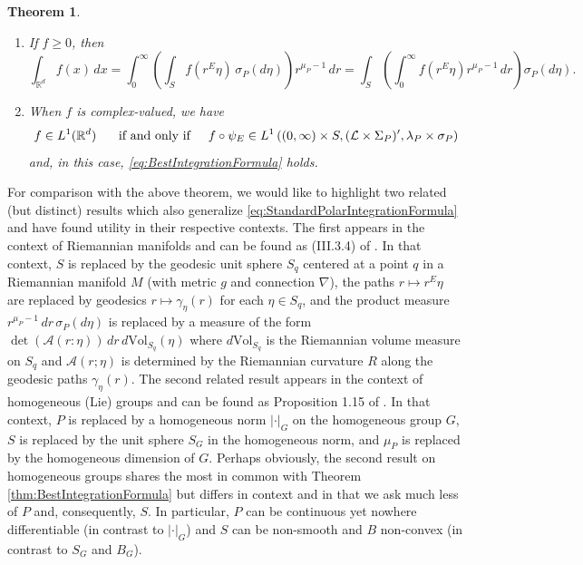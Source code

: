 \documentclass[11pt]{article}
\newtheorem{theorem}{Theorem}[section]
\theoremstyle{remark}
\renewcommand\det{\operatorname{det}}
\begin{document}
\begin{theorem}
\begin{enumerate}
\begin{enumerate}
\item If $f\geq 0$, then
\begin{equation}\label{eq:BestIntegrationFormula}
\int_{\mathbb{R}^d}f(x)\,dx=\int_0^\infty\left(\int_S f(r^E\eta)\,\sigma_P(d\eta)\right)r^{\mu_P-1}\,dr=\int_S\left(\int_0^\infty f(r^E\eta)r^{\mu_P-1}\,dr\right)\sigma_P(d\eta).
\end{equation}
\item When $f$ is complex-valued, we have 
\begin{equation*}f\in L^1(\mathbb{R}^d)\hspace{.5cm}\mbox{ if and only if}\hspace{.5cm}f\circ\psi_E\in L^1\left((0,\infty)\times S,(\mathcal{L}\times\Sigma_P)',\lambda_P\times\sigma_P\right)
\end{equation*} 
and, in this case, \eqref{eq:BestIntegrationFormula} holds.
\end{enumerate}
\end{enumerate}
\end{theorem}

\noindent For comparison with the above theorem, we would like to highlight two related (but distinct) results which also generalize \eqref{eq:StandardPolarIntegrationFormula} and have found utility in their respective contexts. The first appears in the context of Riemannian manifolds and can be found as (III.3.4) of \cite{chavel_riemannian_2006}. In that context, $S$ is replaced by the geodesic unit sphere $S_q$ centered at a point $q$ in a Riemannian manifold $M$ (with metric $g$ and connection $\nabla$), the paths $r\mapsto r^E\eta$ are replaced by geodesics $r\mapsto \gamma_\eta(r)$ for each $\eta\in S_q$, and the product measure $r^{\mu_P-1}\,dr\,\sigma_P(d\eta)$ is replaced by a measure of the form $\det(\mathcal{A}(r:\eta))\,dr\, d\mbox{Vol}_{S_q}(\eta)$ where $d\mbox{Vol}_{S_q}$ is the Riemannian volume measure on $S_q$ and $\mathcal{A}(r;\eta)$ is determined by the Riemannian curvature $R$ along the geodesic paths $\gamma_{\eta}(r)$. The second related result appears in the context of homogeneous (Lie) groups and can be found as Proposition 1.15 of \cite{folland_hardy_1982}. In that context, $P$ is replaced by a homogeneous norm $|\cdot|_G$ on the homogeneous group $G$, $S$ is replaced by  the unit sphere $S_G$ in the homogeneous norm, and $\mu_P$ is replaced by the homogeneous dimension of $G$. Perhaps obviously, the second result on homogeneous groups shares the most in common with Theorem \ref{thm:BestIntegrationFormula} but differs in context and in that we ask much less of $P$ and, consequently, $S$. In particular, $P$ can be continuous yet nowhere differentiable (in contrast to $|\cdot|_G$) and $S$ can be non-smooth and $B$ non-convex (in contrast to $S_G$ and $B_G$).\\
\end{document}
